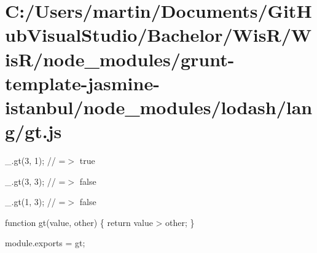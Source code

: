 \hypertarget{_c_1_2_users_2martin_2_documents_2_git_hub_visual_studio_2_bachelor_2_wis_r_2_wis_r_2node_modulebf62746afda1021b31e3c5271fc2e551}{}\section{C\+:/\+Users/martin/\+Documents/\+Git\+Hub\+Visual\+Studio/\+Bachelor/\+Wis\+R/\+Wis\+R/node\+\_\+modules/grunt-\/template-\/jasmine-\/istanbul/node\+\_\+modules/lodash/lang/gt.\+js}
\+\_\+.\+gt(3, 1); // =$>$ true

\+\_\+.\+gt(3, 3); // =$>$ false

\+\_\+.\+gt(1, 3); // =$>$ false


\begin{DoxyCodeInclude}

\textcolor{keyword}{function} gt(value, other) \{
  \textcolor{keywordflow}{return} value > other;
\}

module.exports = gt;
\end{DoxyCodeInclude}
 